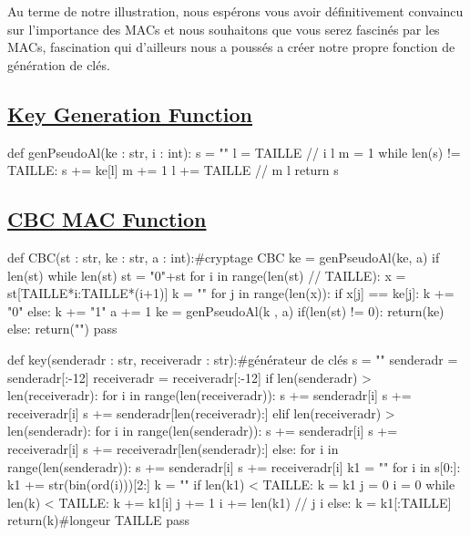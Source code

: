 Au terme de notre illustration, nous espérons vous avoir définitivement convaincu sur l'importance des MACs et nous souhaitons que vous serez fascinés par les MACs, fascination qui d'ailleurs nous a poussés a créer notre propre fonction de génération de clés.

\newpage
\subsection{\textbf{\underline{Key Generation Function}}}

\begin{Pythoncode}[numbers=left, caption={Python Code}]
def genPseudoAl(ke : str, i : int):
    s = ""
    l = TAILLE // i
    l %
    m = 1
    while len(s) != TAILLE:
        s += ke[l]
        m += 1
        l += TAILLE // m
        l %
    return s
\end{Pythoncode}

\subsection{\textbf{\underline{CBC MAC Function}}}

\begin{Pythoncode}[numbers=left, caption={Python Code}]
def CBC(st : str, ke : str, a : int):#cryptage CBC
    ke = genPseudoAl(ke, a)
    if len(st) %
        while len(st) %
            st = "0"+st
    for i in range(len(st) // TAILLE):
        x = st[TAILLE*i:TAILLE*(i+1)]
        k = ""
        for j in range(len(x)):
            if x[j] == ke[j]:
                k += "0"
            else:
                k += "1"
        a += 1
        ke = genPseudoAl(k , a)
    if(len(st) != 0):
        return(ke)
    else:
        return("")
    pass
\end{Pythoncode}
\newpage

\begin{Pythoncode}[numbers=left, caption={Python Code}]
def key(senderadr : str, receiveradr : str):#générateur de clés
    s = ""
    senderadr = senderadr[:-12]
    receiveradr = receiveradr[:-12]
    if len(senderadr) > len(receiveradr):
        for i in range(len(receiveradr)):
            s += senderadr[i]
            s += receiveradr[i]
        s += senderadr[len(receiveradr):]
    elif len(receiveradr) > len(senderadr):
        for i in range(len(senderadr)):
            s += senderadr[i]
            s += receiveradr[i]
        s += receiveradr[len(senderadr):]
    else:
        for i in range(len(senderadr)):
            s += senderadr[i]
            s += receiveradr[i]
    k1 = ""
    for i in s[0:]:
        k1 += str(bin(ord(i)))[2:]
    k = ""
    if len(k1) < TAILLE:
        k = k1
        j = 0
        i = 0
        while len(k) < TAILLE:
            k += k1[i]
            j += 1
            i += len(k1) // j
            i %
    else:
        k = k1[:TAILLE]
    return(k)#longeur TAILLE
    pass
\end{Pythoncode}
\newpage

